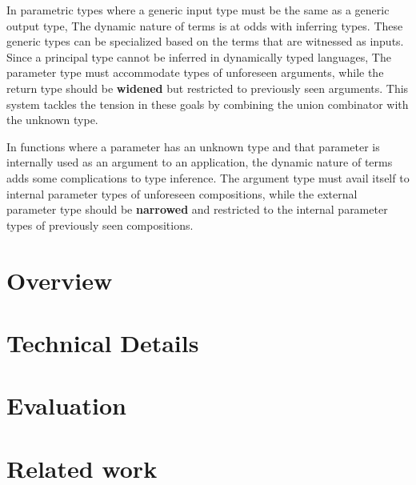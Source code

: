 \documentclass[sigplan,screen]{acmart}
\begin{document}
In parametric types where a generic input type must be the same as a generic output type,
The dynamic nature of terms is at odds with inferring types.
These generic types can be specialized based on the terms that are witnessed as inputs. 
Since a principal type cannot be inferred in dynamically typed languages, 
The parameter type must accommodate types of unforeseen arguments, 
while the return type should be \textbf{widened} but restricted 
to previously seen arguments.
This system tackles the tension in these goals by combining the union combinator  
with the unknown type. 

In functions where a parameter has an unknown type and that parameter is 
internally used as an argument to an application, the dynamic nature of terms  
adds some complications to type inference.
The argument type must avail itself to internal parameter types of unforeseen compositions,
while the external parameter type should be \textbf{narrowed} and restricted 
to the internal parameter types of previously seen compositions.




\section{Overview}

\section{Technical Details}

\section{Evaluation}

\section{Related work}





\end{document}
